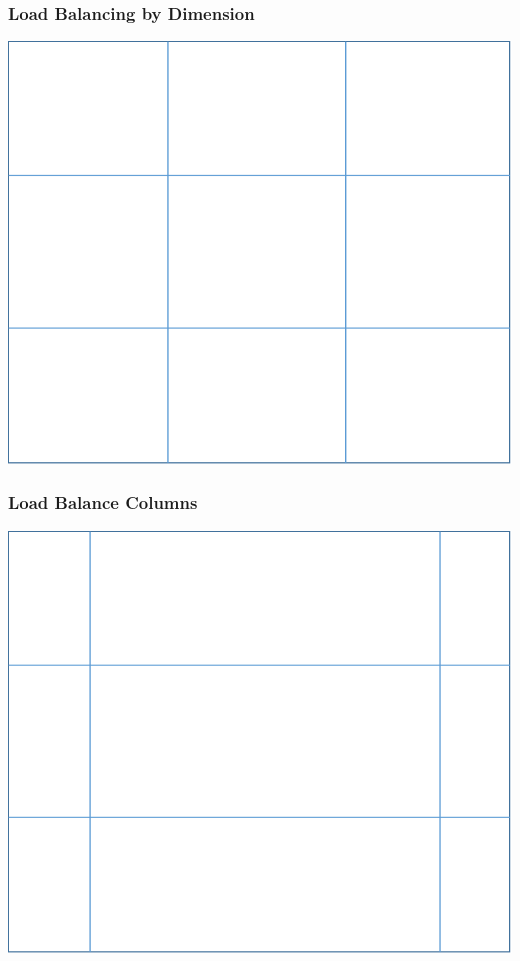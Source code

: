 \documentclass[compress]{beamer}
\begin{document}
\begin{frame}[t]\frametitle{Load Balancing by Dimension}
\centering
\includegraphics[scale=0.5]{figures/initial_1b.pdf}
\end{frame}

\begin{frame}[t]\frametitle{Load Balance Columns}
\centering
\includegraphics[scale=0.5]{figures/row_moves.pdf}
\end{frame}
\end{document}
